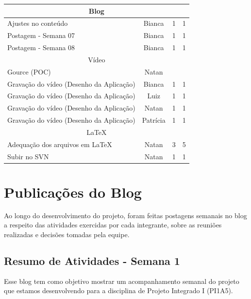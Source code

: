 \documentclass[
    12pt,               %
    openright,          %
    oneside,
    a4paper,            %
    english,            %
    brazil              %
    ]{ifsp-spo-inf-ctds} %
\begin{document}
\begin{apendicesenv}
\begin{quadro}[htb]
\begin{tabular}{|l|c|c|c|}
    \multicolumn{4}{|c|}{Blog} \\ \hline
    Ajustes no conteúdo  & Bianca    & 1  & 1    \\ \hline
    Postagem - Semana 07      & Bianca    & 1  & 1    \\ \hline
    Postagem - Semana 08      & Bianca     & 1 & 1   \\ \hline
    
    \multicolumn{4}{|c|}{Vídeo} \\ \hline
    Gource (POC) & Natan &   &    \\ \hline 
    Gravação do vídeo (Desenho da Aplicação) & Bianca & 1 & 1    \\ \hline
    Gravação do vídeo (Desenho da Aplicação) & Luiz & 1  & 1    \\ \hline
    Gravação do vídeo (Desenho da Aplicação) & Natan & 1  & 1    \\ \hline
    Gravação do vídeo (Desenho da Aplicação) & Patrícia & 1  & 1    \\ \hline
    
    \multicolumn{4}{|c|}{LaTeX} \\ \hline
    Adequação dos arquivos em LaTeX & Natan & 3 & 5   \\ \hline 
    Subir no SVN & Natan & 1 & 1   \\ \hline
    
\end{tabular}
\end{quadro}
\FloatBarrier

\chapter{Publicações do Blog}

Ao longo do desenvolvimento do projeto, foram feitas postagens semanais no blog a respeito das atividades exercidas por cada integrante, sobre as reuniões realizadas e decisões tomadas pela equipe.

\section{Resumo de Atividades - Semana 1}

Esse blog tem como objetivo mostrar um acompanhamento semanal do projeto que estamos desenvolvendo para a disciplina de Projeto Integrado I (PI1A5).


\end{apendicesenv}
\end{document}
